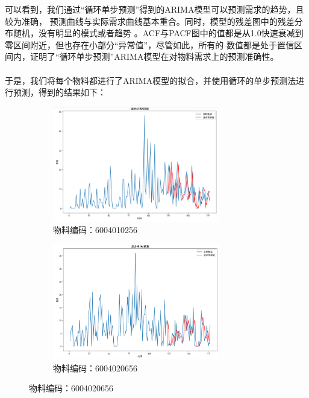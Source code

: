 \documentclass{cumcmthesis}
\begin{document}
        可以看到，我们通过“循环单步预测”得到的ARIMA模型可以预测需求的趋势，且较为准确，
        预测曲线与实际需求曲线基本重合。同时，模型的残差图中的残差分布随机，没有明显的模式或者趋势
        。ACF与PACF图中的值都是从1.0快速衰减到零区间附近，但也存在小部分“异常值”，尽管如此，所有的
        数值都是处于置信区间内，证明了“循环单步预测”ARIMA模型在对物料需求上的预测准确性。\\
        \\
        于是，我们将每个物料都进行了ARIMA模型的拟合，并使用循环的单步预测法进行预测，得到的结果如下：\\
        
        \begin{figure}[ht]
            \centering
            \begin{subfigure}[b]{0.49\textwidth}
                \includegraphics[width=0.8\textwidth]{graph/graph_4.png}
                \caption{物料编码：6004010256}
                \label{fig:image1}
            \end{subfigure}
            \hfill %
            \begin{subfigure}[b]{0.49\textwidth}
                \includegraphics[width=0.8\textwidth]{graph/graph_12.png}
                \caption{物料编码：6004020656}
                \label{fig:image2}
            \end{subfigure}


\end{figure}
\end{document}
